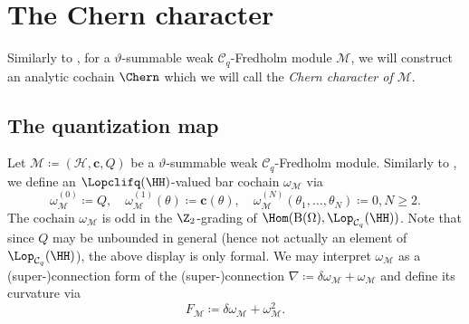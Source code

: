 \documentclass[a4paper, english, 12pt, bibliography=totocnumbered,
index=totoc]{scrartcl}
\begin{document}
\section{The Chern character}\label{Section: Chern character}
Similarly to \cite{GüneysuLudewig}, for a $\vartheta$-summable weak
$\mathcal{C}_q$-Fredholm module $\mathscr{M}$, we will construct an analytic
cochain $\Chern$ which we will call the \textit{Chern character of
	$\mathscr{M}$}.
\subsection{The quantization map}
Let $\mathscr{M} \coloneqq (\mathcal{H}, \mathbf{c}, Q)$ be a
$\vartheta$-summable weak $\mathcal{C}_q$-Fredholm module.
Similarly to \cite[Equation (4.1)]{GüneysuLudewig}, we define an
$\Lopclifq(\HH)$-valued bar cochain $\omega_{\mathscr{M}}$ via
\begin{equation*}
	\omega_{\mathscr{M}}^{(0)} \coloneqq Q, \quad
	\omega_{\mathscr{M}}^{(1)}(\theta) \coloneqq \mathbf{c}(\theta), \quad
	\omega_{\mathscr{M}}^{(N)}(\theta_1, \ldots, \theta_N) \coloneqq 0, N \geq
	2.
\end{equation*}
The cochain $\omega_{\mathscr{M}}$ is odd in the $\Z_2$-grading of
$\Hom(\mathrm{B}(\Omega), \Lop_{\mathcal{C}_q}(\HH))$.
Note that since $Q$ may be unbounded in general (hence not actually an
element of
$\Lop_{\mathcal{C}_q}(\HH)$), the above display is only formal.
We may interpret $\omega_{\mathscr{M}}$ as a (super-)connection form of the
(super-)connection $\nabla \coloneqq \delta \omega_{\mathscr{M}} +
\omega_{\mathscr{M}}$ and define its curvature via
\begin{equation*}
	F_{\mathscr{M}} \coloneqq \delta \omega_{\mathscr{M}} +
	\omega_{\mathscr{M}}^2.
\end{equation*}
\end{document}
